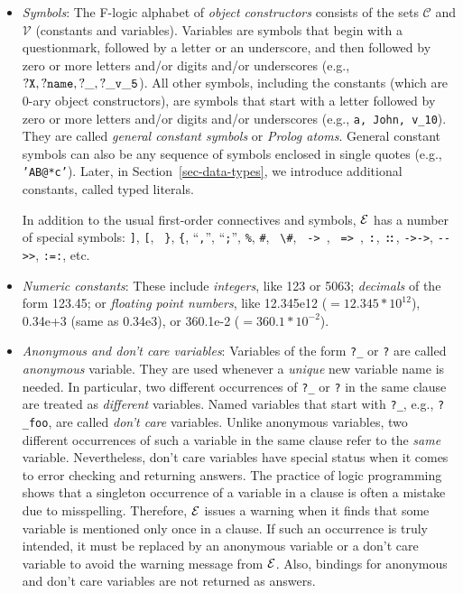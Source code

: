 \documentclass[11pt]{article}
\newcommand{\ERGO}{\mbox{\ensuremath{\cal{E}}\smaller{{\sc{RGO}}}}\xspace}
\newcommand{\FLSYSTEM}{\ERGO}
\newcommand{\isa}{\,{\bf{:}}\,}
\newcommand{\subcl}{\,{\bf{::}}\,}
\newcommand{\mvd}{{\mbox{\tt \,->\,}}}  %
\newcommand{\Mvd}{{\mbox{\tt \,=>\,}}}  %
\newcommand{\bs}{\textbackslash}
\newcommand{\fl}{\mbox{F-logic}\xspace}
\newcommand{\consts}{\ensuremath{\mathcal{C}}\xspace}
\newcommand{\vars}{\ensuremath{\mathcal{V}}\xspace}
\begin{document}
\begin{itemize}
\item \emph{Symbols}: The \fl alphabet of \emph{object constructors}
  consists of the sets \consts
  and \vars
  (constants and variables).  Variables are symbols that begin with a questionmark,
  followed by a letter or an underscore, and then followed by zero or more letters and/or digits and/or
  underscores (e.g., $\tt ?X, ?name, ?\_, ?\_v\_5$).  All other symbols,
  including the constants (which are 0-ary object constructors), are
  symbols that start with a letter followed by zero or more letters and/or digits and/or
  underscores (e.g., {\tt a, John, v\_10}). They are called
  \emph{general constant symbols} or \emph{Prolog atoms}.  
  General constant symbols can also be any sequence of symbols enclosed in single quotes
  (e.g., {\tt 'AB@*c'}).
  Later, in Section~\ref{sec-data-types}, we introduce additional constants,
  called typed literals.
  
  In addition to the usual first-order connectives
  and symbols, \FLSYSTEM has a number of special symbols: {\tt ]}, {\tt [}, {\tt
    \}}, {\tt \{}, ``{\tt ,}'', ``{\tt ;}'', {\tt \%}, {\tt \#}, {\tt
    \bs{}\#}, \mvd,
  \Mvd, \isa, \subcl, {\tt ->->}, \texttt{-{}->{}>},  {\tt :=:}, etc.

\item \emph{Numeric constants}: These include \emph{integers}, like 123 or
  5063; \emph{decimals} of the form 123.45; or \emph{floating point
    numbers}, like 12.345e12 ($= 12.345*10^{12}$), 0.34e+3 (same as
  0.34e3), or 360.1e-2 ($= 360.1*10^{-2}$).
  
\item \emph{Anonymous and don't care variables}: Variables  of the form
  {\tt ?\_} or {\tt ?} are called \emph{anonymous}
  variable. They are used whenever a \emph{unique} new variable name
  is needed.  In
  particular, two different occurrences of {\tt ?\_} or {\tt ?} in the same clause are
  treated as \emph{different} variables. Named variables that start with
  \texttt{?\_}, e.g., {\tt ?\_foo}, are called \emph{don't care} variables.
  Unlike anonymous variables, two different occurrences of such a variable
  in the same clause refer to the \emph{same} variable. Nevertheless, don't
  care variables have special status when it comes to error checking
  and returning answers.  The practice of logic programming shows that a
  singleton occurrence of a variable in a clause is often a mistake due to
  misspelling. Therefore, \FLSYSTEM issues a warning when it finds that some
  variable is mentioned only once in a clause. If such an occurrence is
  truly intended, it must be replaced by an anonymous variable or a don't
  care variable to avoid the warning message from \FLSYSTEM. Also, bindings
  for anonymous and don't care variables are not returned as answers.


\end{itemize}
\end{document}
